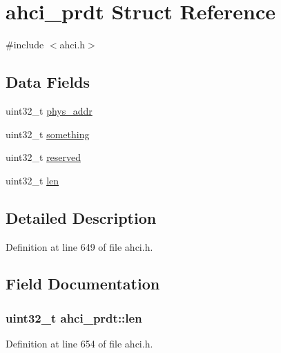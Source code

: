 \hypertarget{structahci__prdt}{}\section{ahci\+\_\+prdt Struct Reference}
\label{structahci__prdt}


{\ttfamily \#include $<$ahci.\+h$>$}

\subsection*{Data Fields}
\begin{DoxyCompactItemize}
\item 
uint32\+\_\+t \hyperlink{structahci__prdt_a9425b0f49c1db09325d54e3ac89f484c}{phys\+\_\+addr}
\item 
uint32\+\_\+t \hyperlink{structahci__prdt_ad0746001774899f0a76d979e224ba575}{something}
\item 
uint32\+\_\+t \hyperlink{structahci__prdt_aa4716f5df6a9c798985643286a4260a4}{reserved}
\item 
uint32\+\_\+t \hyperlink{structahci__prdt_a91317b1c7fe022ac12b35f36835fc82f}{len}
\end{DoxyCompactItemize}


\subsection{Detailed Description}


Definition at line 649 of file ahci.\+h.



\subsection{Field Documentation}
\subsubsection[{\texorpdfstring{len}{len}}]{\setlength{\rightskip}{0pt plus 5cm}uint32\+\_\+t ahci\+\_\+prdt\+::len}\hypertarget{structahci__prdt_a91317b1c7fe022ac12b35f36835fc82f}{}\label{structahci__prdt_a91317b1c7fe022ac12b35f36835fc82f}


Definition at line 654 of file ahci.\+h.

